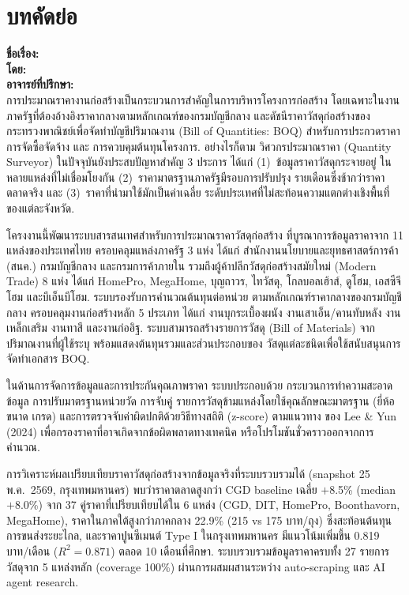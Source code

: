 \chapter*{บทคัดย่อ}

\noindent\textbf{ชื่อเรื่อง:} \thesistitleTH\\
\textbf{โดย:} \authorname\\
\textbf{อาจารย์ที่ปรึกษา:} \advisor\\

การประมาณราคางานก่อสร้างเป็นกระบวนการสำคัญในการบริหารโครงการก่อสร้าง
โดยเฉพาะในงานภาครัฐที่ต้องอ้างอิงราคากลางตามหลักเกณฑ์ของกรมบัญชีกลาง
และดัชนีราคาวัสดุก่อสร้างของกระทรวงพาณิชย์เพื่อจัดทำบัญชีปริมาณงาน
(Bill of Quantities: BOQ) สำหรับการประกวดราคา การจัดซื้อจัดจ้าง และ
การควบคุมต้นทุนโครงการ. อย่างไรก็ตาม วิศวกรประมาณราคา (Quantity Surveyor)
ในปัจจุบันยังประสบปัญหาสำคัญ 3 ประการ ได้แก่ (1)~ข้อมูลราคาวัสดุกระจายอยู่
ในหลายแหล่งที่ไม่เชื่อมโยงกัน (2)~ราคามาตรฐานภาครัฐมีรอบการปรับปรุง
รายเดือนซึ่งช้ากว่าราคาตลาดจริง และ (3)~ราคาที่นำมาใช้มักเป็นค่าเฉลี่ย
ระดับประเทศที่ไม่สะท้อนความแตกต่างเชิงพื้นที่ของแต่ละจังหวัด.

โครงงานนี้พัฒนาระบบสารสนเทศสำหรับการประมาณราคาวัสดุก่อสร้าง
ที่บูรณาการข้อมูลราคาจาก 11 แหล่งของประเทศไทย ครอบคลุมแหล่งภาครัฐ
3 แห่ง ได้แก่ สำนักงานนโยบายและยุทธศาสตร์การค้า (สนค.) กรมบัญชีกลาง
และกรมการค้าภายใน รวมถึงผู้ค้าปลีกวัสดุก่อสร้างสมัยใหม่ (Modern Trade)
8 แห่ง ได้แก่ HomePro, MegaHome, บุญถาวร, ไทวัสดุ, โกลบอลเฮ้าส์,
ดูโฮม, เอสซีจีโฮม และบีเอ็นบีโฮม. ระบบรองรับการคำนวณต้นทุนต่อหน่วย
ตามหลักเกณฑ์ราคากลางของกรมบัญชีกลาง ครอบคลุมงานก่อสร้างหลัก
5 ประเภท ได้แก่ งานบุกระเบื้องผนัง งานเสาเอ็น/คานทับหลัง งานเหล็กเสริม
งานทาสี และงานก่ออิฐ. ระบบสามารถสร้างรายการวัสดุ (Bill of Materials)
จากปริมาณงานที่ผู้ใช้ระบุ พร้อมแสดงต้นทุนรวมและส่วนประกอบของ
วัสดุแต่ละชนิดเพื่อใช้สนับสนุนการจัดทำเอกสาร BOQ.

ในด้านการจัดการข้อมูลและการประกันคุณภาพราคา ระบบประกอบด้วย
กระบวนการทำความสะอาดข้อมูล การปรับมาตรฐานหน่วยวัด การจับคู่
รายการวัสดุข้ามแหล่งโดยใช้คุณลักษณะมาตรฐาน (ยี่ห้อ ขนาด เกรด)
และการตรวจจับค่าผิดปกติด้วยวิธีทางสถิติ (z-score) ตามแนวทาง
ของ Lee \& Yun (2024) เพื่อกรองราคาที่อาจเกิดจากข้อผิดพลาดทางเทคนิค
หรือโปรโมชันชั่วคราวออกจากการคำนวณ.

การวิเคราะห์ผลเปรียบเทียบราคาวัสดุก่อสร้างจากข้อมูลจริงที่ระบบรวบรวมได้
(snapshot 25 พ.ค.\ 2569, กรุงเทพมหานคร) พบว่าราคาตลาดสูงกว่า CGD baseline
เฉลี่ย $+$8.5\% (median $+$8.0\%) จาก 37 คู่ราคาที่เปรียบเทียบได้ใน 6 แหล่ง
(CGD, DIT, HomePro, Boonthavorn, MegaHome),
ราคาในภาคใต้สูงกว่าภาคกลาง 22.9\% (215 vs 175 บาท/ถุง)
ซึ่งสะท้อนต้นทุนการขนส่งระยะไกล, และราคาปูนซีเมนต์ Type I ในกรุงเทพมหานคร
มีแนวโน้มเพิ่มขึ้น 0.819 บาท/เดือน ($R^{2} = 0.871$) ตลอด 10 เดือนที่ศึกษา.
ระบบรวบรวมข้อมูลราคาครบทั้ง 27 รายการวัสดุจาก 5 แหล่งหลัก (coverage 100\%)
ผ่านการผสมผสานระหว่าง auto-scraping และ AI agent research.

